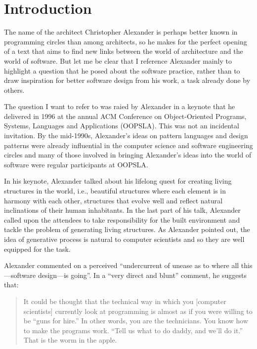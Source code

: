\chapter{Introduction}

The name of the architect Christopher Alexander is perhaps better known in programming
circles than among architects, so he makes for the perfect opening of a text that aims
to find new links between the world of architecture and the world of software. But let
me be clear that I reference Alexander mainly to highlight a question that he posed about
the software practice, rather than to draw inspiration for better software design from his
work, a task already done by others.

The question I want to refer to was raied by Alexander in a keynote that he delivered in
1996 at the annual ACM Conference on Object-Oriented Programs, Systems, Languages and
Applications (OOPSLA). This was not an incidental invitation. By the mid-1990s, Alexander's ideas
on pattern languages and design patterns were already influential in the computer science and
software engineering circles and many of those involved in bringing Alexander's ideas into the
world of software were regular participants at OOPSLA.

In his keynote, Alexander talked about his lifelong quest for creating living structures
in the world, i.e., beautiful structures where each element is in harmony with each other,
structures that evolve well and reflect natural inclinations of their human inhabitants.
In the last part of his talk, Alexander called upon the attendees to take responsibility
for the built environment and tackle the problem of generating living structures.
As Alexander pointed out, the idea of generative process is natural to computer scientists
and so they are well equipped for the task.

Alexander commented on a perceived ``undercurrent of unease as to where all
this---software design---is going''. In a ``very direct and blunt'' comment, he suggests that:

\begin{quote}
It could be thought that the technical way in which you [computer scientists] currently look at
programming is almost as if you were willing to be ``guns for hire.'' In other words, you are the
technicians. You know how to make the programs work. ``Tell us what to do daddy, and we'll do it.''
That is the worm in the apple.
\end{quote}

